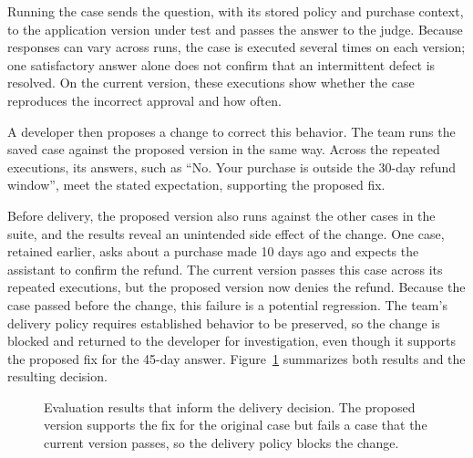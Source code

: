 Running the case sends the question, with its stored policy and purchase
context, to the application version under test and passes the answer to the
judge. Because responses can vary across runs, the case is executed several
times on each version; one satisfactory answer alone does not confirm that an
intermittent defect is resolved. On the current version, these executions show
whether the case reproduces the incorrect approval and how often.

A developer then proposes a change to correct this behavior. The team runs the
saved case against the proposed version in the same way. Across the
repeated executions, its answers, such as \enquote{No. Your purchase is outside
the 30-day refund window}, meet the stated expectation, supporting the proposed
fix.

Before delivery, the proposed version also runs against the other cases in the
suite, and the results reveal an unintended side effect of the change. One
case, retained earlier, asks about a purchase made 10 days ago and expects the
assistant to confirm the refund. The current version passes this case across
its repeated executions, but the proposed version now denies the refund.
Because the case passed before the
change, this failure is a potential regression. The team's delivery policy
requires established behavior to be preserved, so the change is blocked and
returned to the developer for investigation, even though it supports the
proposed fix for the 45-day answer. Figure~\ref{fig:cd4ai-delivery-decision}
summarizes both results and
the resulting decision.

\begin{figure}[htbp]
  \centering
  
  \caption{Evaluation results that inform the delivery decision. The proposed
    version supports the fix for the original case but fails a case that the
    current version passes, so the delivery policy blocks the change.}
  \label{fig:cd4ai-delivery-decision}
\end{figure}
